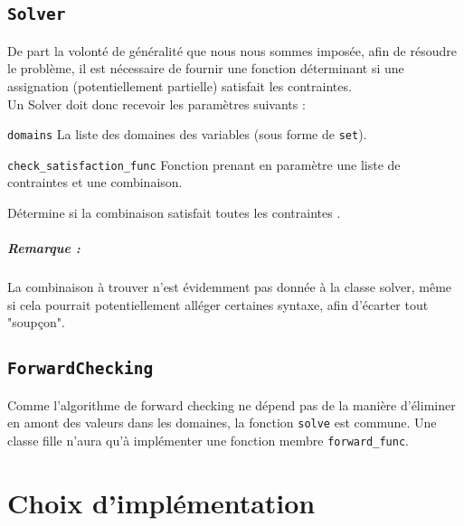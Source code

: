 \documentclass[a4paper, 12pt]{report}
\newcommand{\py}[1]{\texttt{#1}}
\newenvironment{aligneddescription}
	{\begin{tcolorbox}
		\begin{description}[leftmargin=!, labelwidth=\widthof{\bfseries The longest label}]	
	}
	{\end{description}\end{tcolorbox}}
\begin{document}
\subsection*{\py{Solver}}

De part la volonté de généralité que nous nous sommes imposée, afin de résoudre le problème, il est nécessaire de fournir une fonction déterminant si une assignation (potentiellement partielle) satisfait les contraintes. \\

Un Solver doit donc recevoir les paramètres suivants :

\begin{aligneddescription}
	\item[\py{domains}] La liste des domaines des variables (sous forme de \py{set}).
	
	\item[\py{check_satisfaction_func}] Fonction prenant en paramètre une liste de contraintes et une combinaison.
	
	Détermine si la combinaison satisfait toutes les contraintes .
\end{aligneddescription}

\subparagraph*{Remarque :} La combinaison à trouver n'est évidemment pas donnée à la classe solver, même si cela pourrait potentiellement alléger certaines syntaxe, afin d'écarter tout "soupçon".

\subsection*{\py{ForwardChecking}}

Comme l'algorithme de forward checking ne dépend pas de la manière d'éliminer en amont des valeurs dans les domaines, la fonction \py{solve} est commune. Une classe fille n'aura qu'à implémenter une fonction membre \py{forward_func}.


\section*{Choix d'implémentation}
\end{document}
